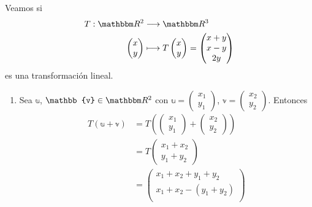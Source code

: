 \begin{example}
    Veamos si
    \begin{align*}
        T: \RR[2] & \longrightarrow \RR[3] \\
        \begin{pmatrix}
            x \\
            y
        \end{pmatrix} & \longmapsto T \begin{pmatrix}
            x \\
            y
        \end{pmatrix} = \begin{pmatrix}
            x + y \\
            x - y \\
            2y
        \end{pmatrix}
    \end{align*}
    es una transformación lineal.
    \begin{enumerate}[label=\roman*)]
        \item Sea $\mathbb{u}$, $\mathbb{v} \in \RR[2]$ con $\mathbb{u} = \begin{pmatrix}
            x_1 \\
            y_1
        \end{pmatrix}$, $\mathbb{v} =  \begin{pmatrix}
            x_2 \\
            y_2
        \end{pmatrix}$. Entonces
        \begin{align*}
            T(\mathbb{u} + \mathbb{v}) & = T \left( \begin{pmatrix}
                x_1 \\
                y_1
            \end{pmatrix} + \begin{pmatrix}
                x_2 \\
                y_2
            \end{pmatrix} \right) \\
            & = T \begin{pmatrix}
                x_1 + x_2 \\
                y_1 + y_2
            \end{pmatrix} \\
            & = \begin{pmatrix}
                x_1 + x_2 + y_1 + y_2 \\
                x_1 + x_2 - (y_1 + y_2) \\

\end{pmatrix}
\end{align*}
\end{enumerate}
\end{example}
